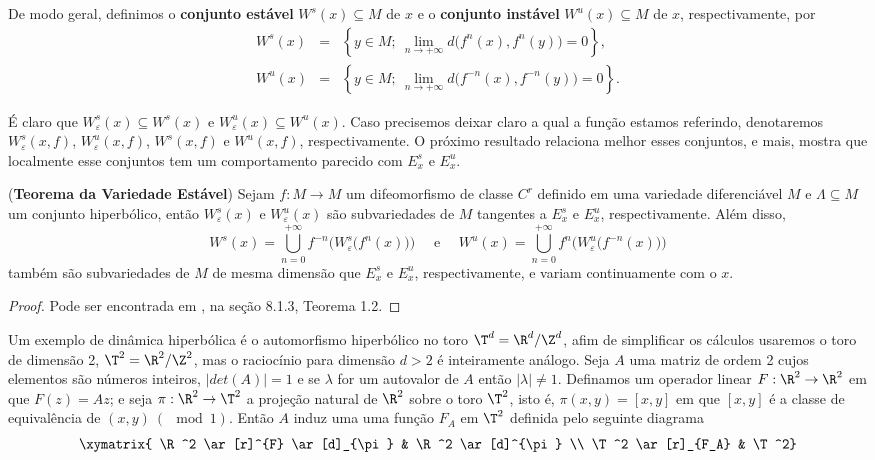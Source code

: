 De modo geral, definimos o \textbf{conjunto estável} $W^s(x)\subseteq M$ de $x$ e o \textbf{conjunto instável} $W^u(x)\subseteq M$ de $x$, respectivamente, por
\begin{eqnarray*}
W^s(x) & = & \left\{y\in M;\ \lim_{n\to+\infty}d\big(f^n(x),f^n(y)\big)=0\right\},\\
W^u(x) & = & \left\{y\in M;\ \lim_{n\to+\infty}d\big(f^{-n}(x),f^{-n}(y)\big)=0\right\}.
\end{eqnarray*}

É claro que $W^s_{\varepsilon}(x)\subseteq W^s(x)$ e $W^u_{\varepsilon}(x)\subseteq W^u(x)$. Caso precisemos deixar claro a qual a função estamos referindo, denotaremos $W^s_{\varepsilon}(x,f)$, $W^u_{\varepsilon}(x,f)$, $W^s(x,f)$ e $W^u(x,f)$, respectivamente. O próximo resultado relaciona melhor esses conjuntos, e mais, mostra que localmente esse conjuntos tem um comportamento parecido com $E^s_x$ e $E^u_x$.

\begin{teorema}\label{teovarest}(\textbf{Teorema da Variedade Estável}) Sejam $f:M\to M$ um difeomorfismo de classe $C^r$ definido em uma variedade diferenciável $M$ e $\Lambda\subseteq M$ um conjunto hiperbólico, então $W^s_{\varepsilon}(x)$ e $W^u_{\varepsilon}(x)$ são subvariedades de $M$ tangentes a $E^s_x$ e $E^u_x$, respectivamente. Além disso,
\begin{equation*}
W^s(x)=\bigcup_{n=0}^{+\infty}f^{-n}\Big(W^s_{\varepsilon}\big(f^{n}(x)\big)\Big)\quad\text{ e }\quad W^u(x)=\bigcup_{n=0}^{+\infty}f^n\Big(W^u_{\varepsilon}\big(f^{-n}(x)\big)\Big)
\end{equation*}
também são subvariedades de $M$ de mesma dimensão que $E^s_x$ e $E^u_x$, respectivamente, e variam continuamente com o $x$. 
\end{teorema}

\begin{proof} Pode ser encontrada em \cite{robinson}, na seção 8.1.3, Teorema 1.2.
\end{proof}

Um exemplo de dinâmica hiperbólica é o automorfismo hiperbólico no toro $\T^d=\R^d/\Z^d$, afim de simplificar os cálculos usaremos o toro de dimensão 2, $\T^2=\R^2/\Z^2$, mas o raciocínio para dimensão $d>2$ é inteiramente análogo. Seja $A$ uma matriz de ordem 2 cujos elementos são números inteiros, $|det(A)|=1$ e se $\lambda$ for um autovalor de $A$ então $|\lambda|\neq1$. Definamos um operador linear $F:\R^2\to\R^2$ em que $F(z)=Az$; e seja $\pi:\R^2\to\T^2$ a projeção natural de $\R^2$ sobre o toro $\T^2$, isto é, $\pi(x,y)=[x,y]$ em que $[x,y]$ é a classe de equivalência de $(x,y)\ (\mod 1)$. Então $A$ induz uma uma função $F_A$ em $\T^2$ definida pelo seguinte diagrama $$\xymatrix{
        \R^2 \ar[r]^{F} \ar[d]_{\pi} & \R^2 \ar[d]^{\pi} \\
        \T^2 \ar[r]_{F_A}       & \T^2}$$

